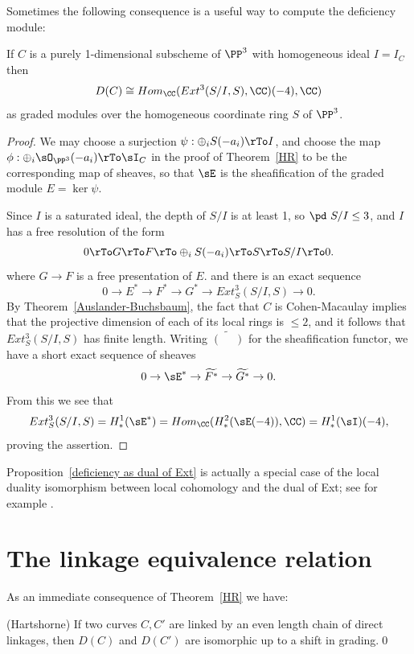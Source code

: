 Sometimes the following consequence is a useful way to compute the deficiency module:

\begin{proposition}\label{deficiency as dual of Ext}
If $C$ is a purely 1-dimensional subscheme of $\PP^3$ with homogeneous ideal $I = I_C$ then 
$$
D(C) \cong Hom_\CC (Ext^3(S/I, S), \CC)(-4), \CC)
$$
as graded modules over the homogeneous coordinate ring $S$ of $\PP^3$.
\end{proposition}

\begin{proof}
We may choose a surjection  $\psi:  \oplus_iS(-a_i)\rTo I$, and choose the map
$\phi: \oplus_i\sO_{\PP^3}(-a_i)\rTo\sI_C$
in the proof of Theorem~\ref{HR}
to be the corresponding map of sheaves, so that
$\sE$ is the sheafification of the graded module $E = \ker \psi$.

Since $I$ is a saturated ideal,
 the depth of $S/I$ is at least 1, so $\pd\ S/I\leq 3$, and $I$ has a free resolution of the form
$$
0\rTo G \rTo F \rTo \oplus_iS(-a_i)  \rTo S\rTo S/I \rTo 0.
$$
where $G\to F$ is a free presentation of $E$. and there is an exact sequence
$$
0 \to E^* \to F^* \to G^* \to Ext^3_S(S/I, S) \to 0.
$$
By Theorem~\ref{Auslander-Buchsbaum}, the fact that $C$ is Cohen-Macaulay implies that the projective dimension of each of its
local rings is $\leq 2$,  and it follows that
$Ext^3_S(S/I, S)$ has finite length. Writing $\widetilde{(\phantom{-})}$ for the sheafification functor,
we have a short exact sequence of sheaves 
$$
0\to \sE^* \to \widetilde{F^*} \to \widetilde{G^*}\to 0.
$$
From this we see that 
$$
Ext^3_S(S/I,S) = H^1_*(\sE^*) = Hom_\CC( H^2_*(\sE(-4)),\CC) = H^1_*(\sI)(-4),
$$
proving the assertion.
\end{proof}

Proposition~\ref{deficiency as dual of Ext} is actually a special case of the local duality isomorphism between local cohomology and the dual of Ext; see for example \cite[Theorem A.1.9]{MR2103875}.

\section{The linkage equivalence relation}
As an immediate consequence of Theorem~\ref{HR} we have:
\begin{corollary}(Hartshorne)
 If two curves $C,C'$ are linked by an even length chain of direct linkages, then 
 $D(C)$ and $D(C')$ are isomorphic up to a shift in grading.\qed
\end{corollary}

